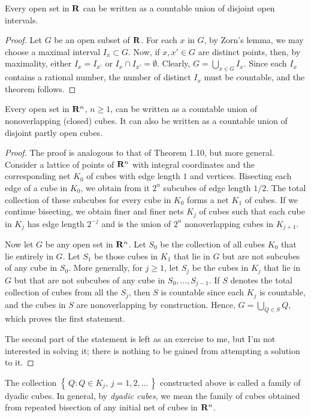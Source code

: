 \begin{theorem}[1.10]
Every open set in $\mathbf{R}$ can be written as a countable union of disjoint
open intervals.
\end{theorem}
\begin{proof}
Let $G$ be an open subset of $\mathbf{R}$. For each $x$ in $G$, by Zorn's lemma,
we may choose a maximal interval $I_x\subset G$. Now, if $x,x'\in G$ are
distinct points, then, by maximality, either $I_{x}=I_{x'}$ or $I_{x}\cap
I_{x'}=\emptyset$. Clearly, $G=\bigcup_{x\in G} I_x$. Since each $I_x$
contains a rational number, the number of distinct $I_x$ must be countable,
and the theorem follows.
\end{proof}
\begin{theorem}[1.11]
Every open set in $\mathbf{R}^n$, $n\geq 1$, can be written as a countable union
of nonoverlapping (closed) cubes. It can also be written as a countable
union of disjoint partly open cubes.
\end{theorem}
\begin{proof}
The proof is analogous to that of Theorem 1.10, but more general. Consider
a lattice of points of $\mathbf{R}^n$ with integral coordinates and the
corresponding net $K_0$ of cubes with edge length $1$ and
vertices. Bisecting each edge of a cube in $K_0$, we obtain from it $2^n$
subcubes of edge length $1/2$. The total collection of these subcubes for
every cube in $K_0$ forms a net $K_1$ of cubes. If we continue bisecting,
we obtain finer and finer nets $K_j$ of cubes such that each cube in $K_j$
has edge length $2^{-j}$ and is the union of $2^n$ nonoverlapping cubes in
$K_{j+1}$.

Now let $G$ be any open set in $\mathbf{R}^n$. Let $S_0$ be the collection of all
cubes $K_0$ that lie entirely in $G$. Let $S_1$ be those cubes in $K_1$
that lie in $G$ but are not subcubes of any cube in $S_0$. More generally,
for $j\geq 1$, let $S_j$ be the cubes in $K_j$ that lie in $G$ but that are
not subcubes of any cube in $S_0,\dotsc,S_{j-1}$. If $S$ denotes the total
collection of cubes from all the $S_j$, then $S$ is countable since each
$K_j$ is countable, and the cubes in $S$ are nonoverlapping by
construction. Hence, $G=\bigcup_{Q\in S}Q$, which proves the first
statement.

The second part of the statement is left as an exercise to me, but I'm not
interested in solving it; there is nothing to be gained from attempting a
solution to it.
\end{proof}

The collection $\left\{\,Q:\text{$Q\in K_j$, $j=1,2,\dotsc$}\,\right\}$
constructed above is called a family of dyadic cubes. In general, by
\emph{dyadic cubes}, we mean the family of cubes obtained from repeated
bisection of any initial net of cubes in $\mathbf{R}^n$.

